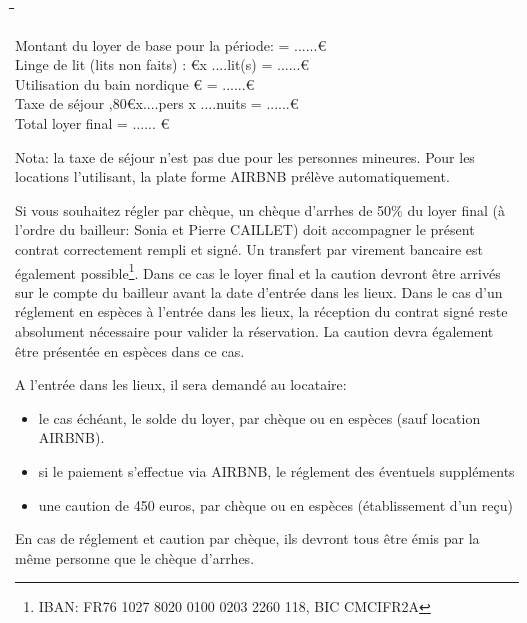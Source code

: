 \documentclass[a4paper,11pt]{article}
\begin{document}
\begin{tabbing}
  
 \hspace{6cm}\=  										\hspace{1cm}\=   	\hspace{4cm}\= 	\hspace{2cm}\= 		\hspace{2cm}\=	\kill


Montant du loyer de base pour la période: \>		\>		\>=			\>......\>\euro	   		\\

Linge de lit (lits non faits) :			 					\euro		      			\>x ....lit(s)       				\>=  			\>......\>\euro				\\





Utilisation du bain nordique \euro		\>		\>=			\>......\>\euro	   		\\

Taxe de séjour ,80\euro		\>x....pers x ....nuits		\>=			\>......\>\euro	   		\\

Total loyer final    										\>						\>  					\>=  							\>......					\>\euro			\\ 

 \end{tabbing}

Nota: la taxe de séjour n'est pas due pour les personnes mineures. Pour les locations l'utilisant, la plate forme AIRBNB prélève automatiquement.


\vspace{0.5cm}

  
Si vous souhaitez régler par chèque, un chèque d'arrhes de 50\% du loyer final (à l'ordre du bailleur: Sonia et Pierre CAILLET)  doit accompagner le présent contrat correctement rempli et signé. 
Un transfert par virement bancaire est également possible\footnote{IBAN: FR76 1027 8020 0100 0203 2260 118, BIC CMCIFR2A}. Dans ce cas le loyer final et la caution devront être arrivés sur le compte du bailleur avant la date d'entrée dans les lieux.
Dans le cas d'un réglement en espèces à l'entrée dans les lieux, la réception du contrat signé reste absolument nécessaire pour valider la réservation. La caution devra également être présentée en espèces dans ce cas.


\vspace{0.5cm}

A l'entrée dans les lieux, il sera demandé au locataire:
\begin{itemize}
\item le cas échéant, le solde du loyer, par chèque ou en espèces (sauf location AIRBNB).
\item si le paiement s'effectue via AIRBNB, le réglement des éventuels suppléments
\item une caution de 450 euros, par chèque ou en espèces (établissement d'un reçu)
\end{itemize}
En cas de réglement et caution par chèque, ils devront tous être émis par la même personne que le chèque d'arrhes.
\end{document}
